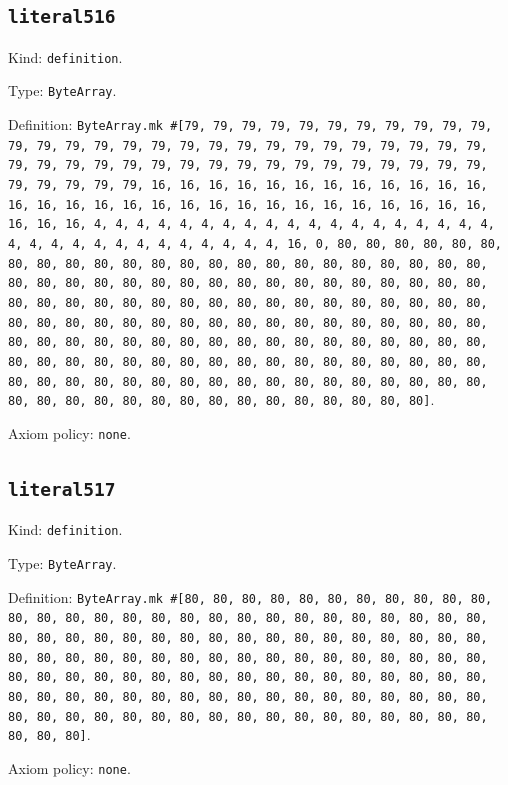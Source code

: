 \documentclass[11pt]{article}
\begin{document}
\subsection*{\texttt{literal516}}
\noindent Kind: \texttt{definition}.\par
\noindent Type: \texttt{ByteArray}.\par
\noindent Definition: \texttt{ByteArray.mk \#[79, 79, 79, 79, 79, 79, 79, 79, 79, 79, 79, 79, 79, 79, 79, 79, 79, 79, 79, 79, 79, 79, 79, 79, 79, 79, 79, 79, 79, 79, 79, 79, 79, 79, 79, 79, 79, 79, 79, 79, 79, 79, 79, 79, 79, 79, 79, 79, 79, 79, 16, 16, 16, 16, 16, 16, 16, 16, 16, 16, 16, 16, 16, 16, 16, 16, 16, 16, 16, 16, 16, 16, 16, 16, 16, 16, 16, 16, 16, 16, 16, 16, 4, 4, 4, 4, 4, 4, 4, 4, 4, 4, 4, 4, 4, 4, 4, 4, 4, 4, 4, 4, 4, 4, 4, 4, 4, 4, 4, 4, 4, 4, 4, 4, 16, 0, 80, 80, 80, 80, 80, 80, 80, 80, 80, 80, 80, 80, 80, 80, 80, 80, 80, 80, 80, 80, 80, 80, 80, 80, 80, 80, 80, 80, 80, 80, 80, 80, 80, 80, 80, 80, 80, 80, 80, 80, 80, 80, 80, 80, 80, 80, 80, 80, 80, 80, 80, 80, 80, 80, 80, 80, 80, 80, 80, 80, 80, 80, 80, 80, 80, 80, 80, 80, 80, 80, 80, 80, 80, 80, 80, 80, 80, 80, 80, 80, 80, 80, 80, 80, 80, 80, 80, 80, 80, 80, 80, 80, 80, 80, 80, 80, 80, 80, 80, 80, 80, 80, 80, 80, 80, 80, 80, 80, 80, 80, 80, 80, 80, 80, 80, 80, 80, 80, 80, 80, 80, 80, 80, 80, 80, 80, 80, 80, 80, 80, 80, 80, 80, 80, 80, 80, 80, 80, 80, 80]}.\par
\noindent Axiom policy: \texttt{none}.\par
\subsection*{\texttt{literal517}}
\noindent Kind: \texttt{definition}.\par
\noindent Type: \texttt{ByteArray}.\par
\noindent Definition: \texttt{ByteArray.mk \#[80, 80, 80, 80, 80, 80, 80, 80, 80, 80, 80, 80, 80, 80, 80, 80, 80, 80, 80, 80, 80, 80, 80, 80, 80, 80, 80, 80, 80, 80, 80, 80, 80, 80, 80, 80, 80, 80, 80, 80, 80, 80, 80, 80, 80, 80, 80, 80, 80, 80, 80, 80, 80, 80, 80, 80, 80, 80, 80, 80, 80, 80, 80, 80, 80, 80, 80, 80, 80, 80, 80, 80, 80, 80, 80, 80, 80, 80, 80, 80, 80, 80, 80, 80, 80, 80, 80, 80, 80, 80, 80, 80, 80, 80, 80, 80, 80, 80, 80, 80, 80, 80, 80, 80, 80, 80, 80, 80, 80, 80, 80, 80, 80, 80, 80, 80]}.\par
\noindent Axiom policy: \texttt{none}.\par
\end{document}
